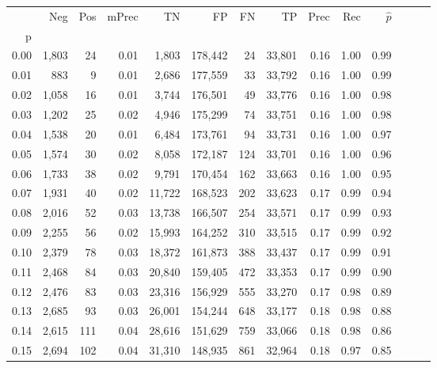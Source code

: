 \begin{tabular}{rrrrrrrrrrrrrr}
\toprule
{} &    Neg &  Pos & mPrec &       TN &       FP &      FN &      TP &  Prec &   Rec & $\hat{p}$ \\
p    &        &      &       &          &          &         &         &       &       &           \\
\midrule
0.00 &  1,803 &   24 &  0.01 &    1,803 &  178,442 &      24 &  33,801 &  0.16 &  1.00 &      0.99 \\
0.01 &    883 &    9 &  0.01 &    2,686 &  177,559 &      33 &  33,792 &  0.16 &  1.00 &      0.99 \\
0.02 &  1,058 &   16 &  0.01 &    3,744 &  176,501 &      49 &  33,776 &  0.16 &  1.00 &      0.98 \\
0.03 &  1,202 &   25 &  0.02 &    4,946 &  175,299 &      74 &  33,751 &  0.16 &  1.00 &      0.98 \\
0.04 &  1,538 &   20 &  0.01 &    6,484 &  173,761 &      94 &  33,731 &  0.16 &  1.00 &      0.97 \\
0.05 &  1,574 &   30 &  0.02 &    8,058 &  172,187 &     124 &  33,701 &  0.16 &  1.00 &      0.96 \\
0.06 &  1,733 &   38 &  0.02 &    9,791 &  170,454 &     162 &  33,663 &  0.16 &  1.00 &      0.95 \\
0.07 &  1,931 &   40 &  0.02 &   11,722 &  168,523 &     202 &  33,623 &  0.17 &  0.99 &      0.94 \\
0.08 &  2,016 &   52 &  0.03 &   13,738 &  166,507 &     254 &  33,571 &  0.17 &  0.99 &      0.93 \\
0.09 &  2,255 &   56 &  0.02 &   15,993 &  164,252 &     310 &  33,515 &  0.17 &  0.99 &      0.92 \\
0.10 &  2,379 &   78 &  0.03 &   18,372 &  161,873 &     388 &  33,437 &  0.17 &  0.99 &      0.91 \\
0.11 &  2,468 &   84 &  0.03 &   20,840 &  159,405 &     472 &  33,353 &  0.17 &  0.99 &      0.90 \\
0.12 &  2,476 &   83 &  0.03 &   23,316 &  156,929 &     555 &  33,270 &  0.17 &  0.98 &      0.89 \\
0.13 &  2,685 &   93 &  0.03 &   26,001 &  154,244 &     648 &  33,177 &  0.18 &  0.98 &      0.88 \\
0.14 &  2,615 &  111 &  0.04 &   28,616 &  151,629 &     759 &  33,066 &  0.18 &  0.98 &      0.86 \\
0.15 &  2,694 &  102 &  0.04 &   31,310 &  148,935 &     861 &  32,964 &  0.18 &  0.97 &      0.85 \\

\end{tabular}
